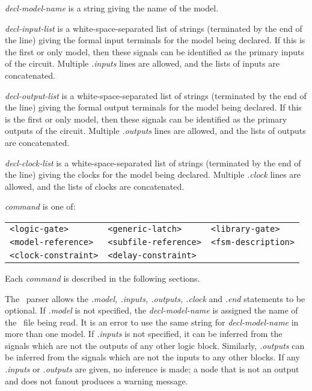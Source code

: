 {\begin{pespace}
\begin{description}
\item {\em decl-model-name} is a string giving the name of the model.

\item {\em decl-input-list} is a white-space-separated list of strings
(terminated by the end of the line) giving the formal input terminals for the
model being declared.  If this is the first or only model, then these signals
can be identified as the primary inputs of the circuit.  Multiple {\em
.inputs} lines are allowed, and the lists of inputs are concatenated.

\item {\em decl-output-list} is a white-space-separated list of strings
(terminated by the end of the line) giving the formal output terminals for
the model being declared.  If this is the first or only model, then these
signals can be identified as the primary outputs of the circuit.  Multiple
{\em .outputs} lines are allowed, and the lists of outputs are concatenated.

\item {\em decl-clock-list} is a white-space-separated list of strings
(terminated by the end of the line) giving the clocks for the model being
declared.  Multiple {\em .clock} lines are allowed, and the lists of clocks
are concatenated.

\item {\em command} is one of:
\begin{pespace}\nopagebreak[3]\begin{tabular} {l l l}
{\verb|<logic-gate>|} & {\verb|<generic-latch>|} & {\verb|<library-gate>|} \\
{\verb|<model-reference>|} & {\verb|<subfile-reference>|} & {\verb|<fsm-description>|} \\
{\verb|<clock-constraint>|} & {\verb|<delay-constraint>|} 
\end{tabular}\end{pespace}

Each {\em command} is described in the following sections.
\end{description}

The \BLIF\ parser allows the {\em .model, .inputs, .outputs, .clock} and
{\em .end} statements to be optional.  If {\em .model} is not specified, the
{\em decl-model-name} is assigned the name of the \BLIF\ file being read.
It is an error to use the same string for {\em decl-model-name} in more than
one model.  If {\em .inputs} is not specified, it can be inferred from the
signals which are not the outputs of any other logic block.  Similarly, {\em
.outputs} can be inferred from the signals which are not the inputs to any
other blocks.  If any {\em .inputs} or {\em .outputs} are given, no
inference is made; a node that is not an output and does not fanout produces
a warning message.


\end{pespace}}
